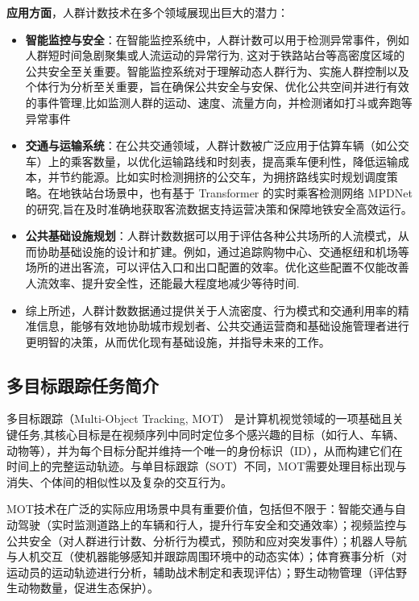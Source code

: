 \textbf{应用方面}，人群计数技术在多个领域展现出巨大的潜力：
\begin{itemize}
  \item \textbf{智能监控与安全}：在智能监控系统中，人群计数可以用于检测异常事件，例如人群短时间急剧聚集或人流运动的异常行为, 这对于铁路站台等高密度区域的公共安全至关重要\cite{01_noauthor_deep_2024}。智能监控系统对于理解动态人群行为、实施人群控制以及个体行为分析至关重要，旨在确保公共安全与安保、优化公共空间并进行有效的事件管理\cite{15_ganga_object_2024},比如监测人群的运动、速度、流量方向，并检测诸如打斗或奔跑等异常事件\cite{03_abdou_crowd_2020}
  \item \textbf{交通与运输系统}：在公共交通领域，人群计数被广泛应用于估算车辆（如公交车）上的乘客数量，以优化运输路线和时刻表，提高乘车便利性，降低运输成本，并节约能源\cite{33or34_li_lightweight_2023}。比如实时检测拥挤的公交车，为拥挤路线实时规划调度策略\cite{55_tsiktsiris_improving_2024}。在地铁站台场景中，也有基于 Transformer 的实时乘客检测网络 MPDNet 的研究\cite{64_yang_mpdnet_2022},旨在及时准确地获取客流数据支持运营决策和保障地铁安全高效运行。
  \item \textbf{公共基础设施规划}：人群计数数据可以用于评估各种公共场所的人流模式，从而协助基础设施的设计和扩建。例如，通过追踪购物中心、交通枢纽和机场等场所的进出客流，可以评估入口和出口配置的效率。优化这些配置不仅能改善人流效率、提升安全性，还能最大程度地减少等待时间\cite{17_gupta_crowd_2024}.
  \item 综上所述，人群计数数据通过提供关于人流密度、行为模式和交通利用率的精准信息，能够有效地协助城市规划者、公共交通运营商和基础设施管理者进行更明智的决策，从而优化现有基础设施，并指导未来的工作。
\end{itemize}

\bigskip


\subsection{多目标跟踪任务简介}
多目标跟踪（Multi-Object Tracking, MOT） 是计算机视觉领域的一项基础且关键任务,其核心目标是在视频序列中同时定位多个感兴趣的目标（如行人、车辆、动物等），并为每个目标分配并维持一个唯一的身份标识（ID），从而构建它们在时间上的完整运动轨迹\cite{103}\cite{116}\cite{152}。与单目标跟踪（SOT）不同，MOT需要处理目标出现与消失、个体间的相似性以及复杂的交互行为\cite{86}。

MOT技术在广泛的实际应用场景中具有重要价值，包括但不限于：智能交通与自动驾驶（实时监测道路上的车辆和行人，提升行车安全和交通效率\cite{162}）；视频监控与公共安全（对人群进行计数、分析行为模式，预防和应对突发事件\cite{60_wang_catrack_2025}）；机器人导航与人机交互（使机器能够感知并跟踪周围环境中的动态实体\cite{160}）；体育赛事分析（对运动员的运动轨迹进行分析，辅助战术制定和表现评估\cite{200}）；野生动物管理（评估野生动物数量，促进生态保护\cite{91}）。

